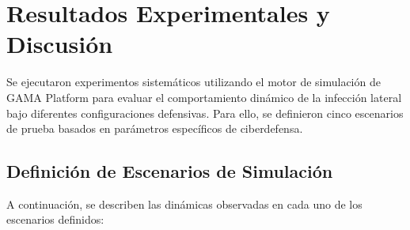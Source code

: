\section{Resultados Experimentales y Discusión}
\label{sec:resultados}
Se ejecutaron experimentos sistemáticos utilizando el motor de simulación de GAMA Platform para evaluar el comportamiento dinámico de la infección lateral bajo diferentes configuraciones defensivas. Para ello, se definieron cinco escenarios de prueba basados en parámetros específicos de ciberdefensa.

\subsection{Definición de Escenarios de Simulación}
A continuación, se describen las dinámicas observadas en cada uno de los escenarios definidos:

